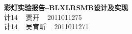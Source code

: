 \documentclass[a4paper]{article}
\begin{document}
\begin{center}
	{\Large \bf 彩灯实验报告--BLXLRSMB设计及实现} \\
	\vspace{1.5em}
	计14 ~ 贾\hspace{1em}开 ~ 2011011275 \\
	计14 ~ 吴育昕 ~ 2011011271
\end{center}

\tableofcontents





\end{document}
